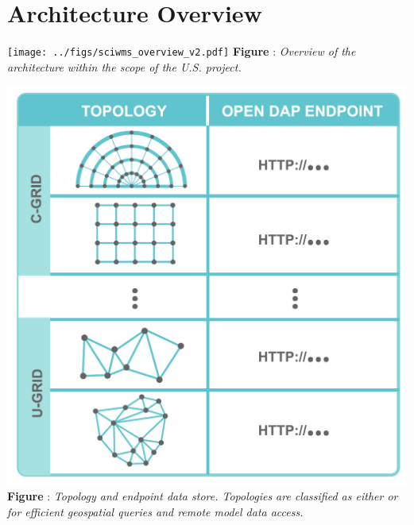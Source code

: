 \documentclass[noback,noborder,portrait,twocolumn]{cuposter}
\begin{document}
\section{Architecture Overview}




\begin{minipage}[t]{0.49\linewidth}
  \centering
  \texttt{[image: ../figs/sciwms\_overview\_v2.pdf]}
  \captionspace{}
  \textbf{Figure \getIncFigcounter{}}: \textit{Overview of the \sciwms{} architecture within the scope of the U.S. \ioos{} \comt{} project.}
\end{minipage}
\begin{minipage}[t]{0.49\linewidth}
  \centering
  \includegraphics[width=\linewidth]{../figs/sciwms_book_db_topology_endpoint_chart}
  \textbf{Figure \getIncFigcounter{}}: \textit{Topology and endpoint data store. Topologies are classified as either \cgrid{} or \ugrid{} for efficient geospatial queries and remote model data access.}
\end{minipage}
\end{document}
